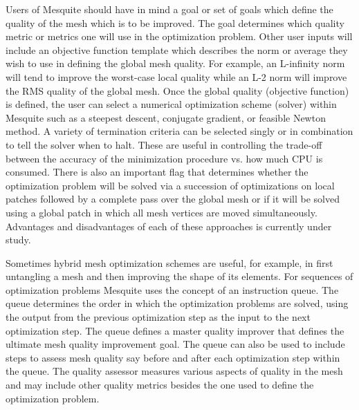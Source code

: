 Users of Mesquite should have in mind a goal or set of goals which define 
the quality of the mesh which is to be improved. The goal determines which
quality metric or metrics one will use in the optimization problem. Other 
user inputs will include an objective function template which describes 
the norm or average they wish to use in defining the global mesh quality. 
For example, an L-infinity norm will tend to improve the worst-case local 
quality while an L-2 norm will improve the RMS quality of the global mesh. 
Once the global quality (objective function) is defined, the user can 
select a numerical optimization scheme (solver) within Mesquite such as a 
steepest descent, conjugate gradient, or feasible Newton method. A variety of 
termination criteria can be selected singly or in combination to tell the 
solver when to halt. These are useful in controlling the trade-off between
the accuracy of the minimization procedure vs. how much CPU is consumed. 
There is also an important flag that determines whether the optimization 
problem will be solved via a succession of optimizations on local patches 
followed by a complete pass over the global mesh or if it will be solved using 
a global patch in which all mesh vertices are moved simultaneously. Advantages
and disadvantages of each of these approaches is currently under study.\newline

Sometimes hybrid mesh optimization schemes are useful, for example, in 
first untangling a mesh and then improving the shape of its elements. For 
sequences of optimization problems Mesquite uses the concept of an 
instruction queue.  The queue determines the order in which the optimization
problems are solved, using the output from the previous optimization step 
as the input to the next optimization step. The queue defines a master 
quality improver that defines the ultimate mesh quality improvement goal.
The queue can also be used to include steps to assess mesh quality say 
before and after each optimization step within the queue.  The quality 
assessor measures various aspects of quality in the mesh and may include 
other quality metrics besides the one used to define the optimization problem.
\newline

